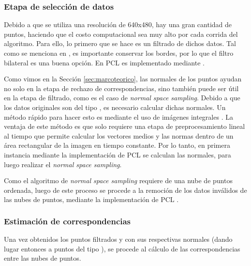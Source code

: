 \subsubsection{Etapa de selección de datos}
Debido a que se utiliza una resolución de 640x480, hay una gran cantidad de puntos, haciendo que el costo computacional sea muy alto por cada corrida del algoritmo. Para ello, lo primero que se hace es un filtrado de dichos datos. Tal como se menciona en \cite{holz2015}, es importante conservar los bordes, por lo que el filtro bilateral es una buena opción. En PCL es implementado mediante .

Como vimos en la Sección \ref{sec:marcoteorico}, las normales de los puntos ayudan no solo en la etapa de rechazo de correspondencias, sino también puede ser útil en la etapa de filtrado, como es el caso de \textit{normal space sampling}. Debido a que los datos originales son del tipo , es necesario calcular dichas normales. Un método rápido para hacer esto es mediante el uso de imágenes integrales \cite{holzer2012}. La ventaja de este método es que solo requiere una etapa de preprocesamiento lineal al tiempo que permite calcular los vectores medios y las normas dentro de un área rectangular de la imagen en tiempo constante. Por lo tanto, en primera instancia mediante la implementación de PCL  se calculan las normales, para luego realizar el \textit{normal space sampling}.

Como el algoritmo de \textit{normal space sampling} requiere de una nube de puntos ordenada, luego de este proceso se procede a la remoción de los datos inválidos de las nubes de puntos, mediante la implementación de PCL .

\subsubsection{Estimación de correspondencias}
Una vez obtenidos los puntos filtrados y con sus respectivas normales (dando lugar entonces a puntos del tipo ), se procede al cálculo de las correspondencias entre las nubes de puntos.

